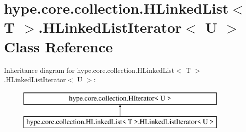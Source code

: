 \hypertarget{classhype_1_1core_1_1collection_1_1_h_linked_list_3_01_t_01_4_1_1_h_linked_list_iterator_3_01_u_01_4}{\section{hype.\-core.\-collection.\-H\-Linked\-List$<$ T $>$.H\-Linked\-List\-Iterator$<$ U $>$ Class Reference}
\label{classhype_1_1core_1_1collection_1_1_h_linked_list_3_01_t_01_4_1_1_h_linked_list_iterator_3_01_u_01_4}
}
Inheritance diagram for hype.\-core.\-collection.\-H\-Linked\-List$<$ T $>$.H\-Linked\-List\-Iterator$<$ U $>$\-:\begin{figure}[H]
\begin{center}
\leavevmode
\includegraphics[height=2.000000cm]{classhype_1_1core_1_1collection_1_1_h_linked_list_3_01_t_01_4_1_1_h_linked_list_iterator_3_01_u_01_4}
\end{center}
\end{figure}
